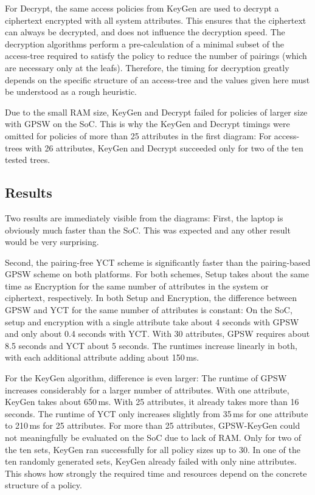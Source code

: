 For Decrypt, the same access policies from KeyGen are used to decrypt a ciphertext encrypted with all system attributes.
This ensures that the ciphertext can always be decrypted, and does not influence the decryption speed.
The decryption algorithms perform a pre-calculation of a minimal subset of the \gls{access-tree} required to satisfy the policy to reduce the number of pairings (which are necessary only at the leafs).
Therefore, the timing for decryption greatly depends on the specific structure of an \gls{access-tree} and the values given here must be understood as a rough heuristic.

Due to the small RAM size, KeyGen and Decrypt failed for policies of larger size with GPSW on the SoC.
This is why the KeyGen and Decrypt timings were omitted for policies of more than 25 attributes in the first diagram:
For \glspl{access-tree} with 26 attributes, KeyGen and Decrypt succeeded only for two of the ten tested trees.

\subsection{Results}
Two results are immediately visible from the diagrams:
First, the laptop is obviously much faster than the SoC.
This was expected and any other result would be very surprising.

Second, the pairing-free YCT scheme is significantly faster than the pairing-based GPSW scheme on both platforms. 
For both schemes, Setup takes about the same time as Encryption for the same number of attributes in the system or ciphertext, respectively.
In both Setup and Encryption, the difference between GPSW and YCT for the same number of attributes is constant:
On the SoC, setup and encryption with a single attribute take about 4 seconds with GPSW and only about 0.4 seconds with YCT.
With 30 attributes, GPSW requires about 8.5 seconds and YCT about 5 seconds.
The runtimes increase linearly in both, with each additional attribute adding about 150\,ms.

For the KeyGen algorithm, difference is even larger:
The runtime of GPSW increases considerably for a larger number of attributes.
With one attribute, KeyGen takes about 650\,ms. With 25 attributes, it already takes more than 16 seconds.
The runtime of YCT only increases slightly from 35\,ms for one attribute to 210\,ms for 25 attributes.
For more than 25 attributes, GPSW-KeyGen could not meaningfully be evaluated on the SoC due to lack of RAM.
Only for two of the ten sets, KeyGen ran successfully for all policy sizes up to 30.
In one of the ten randomly generated sets, KeyGen already failed with only nine attributes.
This shows how strongly the required time and resources depend on the concrete structure of a policy.

